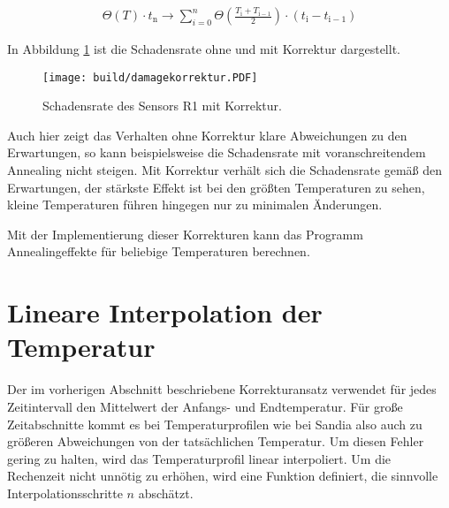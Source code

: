 \begin{align}
  \Theta(T) \cdot t_{\mathrm{n}} \rightarrow \sum_{i=0}^n   \Theta \left(\frac{T_{\mathrm{i}} +T_{\mathrm{i-1}}}{2}\right) \cdot  (t_{\mathrm{i}} - t_{\mathrm{i-1}})
\end{align}

In Abbildung \ref{fig:korrektur_damage} ist die Schadensrate ohne und mit Korrektur
dargestellt.

\begin{figure}
  \centering
    \texttt{[image: build/damagekorrektur.PDF]}
\caption{Schadensrate des Sensors R1 mit Korrektur.}
\label{fig:korrektur_damage}
\end{figure}


Auch hier zeigt das Verhalten ohne Korrektur klare Abweichungen zu den
Erwartungen, so kann beispielsweise die Schadensrate mit voranschreitendem Annealing nicht steigen.
Mit Korrektur verhält sich die Schadensrate gemäß den Erwartungen, der stärkste
Effekt ist bei den größten Temperaturen zu sehen, kleine Temperaturen führen hingegen
nur zu minimalen Änderungen.

Mit der Implementierung dieser Korrekturen kann das Programm Annealingeffekte für
beliebige Temperaturen berechnen.



\section{Lineare Interpolation der Temperatur}
Der im vorherigen Abschnitt beschriebene Korrekturansatz verwendet für jedes
Zeitintervall den Mittelwert der Anfangs- und Endtemperatur. Für große
Zeitabschnitte kommt es bei Temperaturprofilen wie bei Sandia also auch zu größeren Abweichungen von der tatsächlichen
Temperatur. Um diesen Fehler gering zu halten, wird das Temperaturprofil
linear interpoliert.
Um die Rechenzeit nicht unnötig zu erhöhen, wird eine Funktion definiert, die sinnvolle
Interpolationsschritte $n$ abschätzt.

